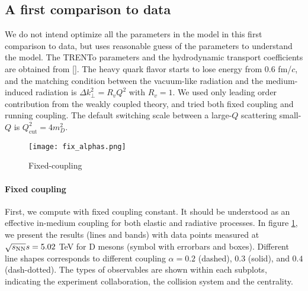 \subsection{A first comparison to data}
We do not intend optimize all the parameters in the model in this first comparison to data, but uses reasonable guess of the parameters to understand the model.
The TRENTo parameters and the hydrodynamic transport coefficients are obtained from [].
The heavy quark flavor starts to lose energy from $0.6$ fm/$c$, and the matching condition between the vacuum-like radiation and the medium-induced radiation is $\Delta k_\perp^2 = R_v Q^2$ with $R_v = 1$.
We used only leading order contribution from the weakly coupled theory, and tried both fixed coupling and running coupling.
The default switching scale between a large-$Q$ scattering small-$Q$ is $Q_{\textrm{cut}}^2 = 4 m_D^2$.

\begin{figure}
\centering
\texttt{[image: fix\_alphas.png]}
\caption{Fixed-coupling}
\label{fig:new:fix-a}
\end{figure}

\paragraph{Fixed coupling} First, we compute with fixed coupling constant.
It should be understood as an effective in-medium coupling for both elastic and radiative processes.
In figure \ref{fig:new:fix-a}, we present the results (lines and bands) with data points measured at $\sqrt{s_\mathrm{NN}}{s} = 5.02$ TeV for D mesons (symbol with errorbars and boxes).
Different line shapes corresponds to different coupling $\alpha=0.2$ (dashed), $0.3$ (solid), and $0.4$ (dash-dotted). 
The types of observables are shown within each subplots, indicating the experiment collaboration, the collision system and the centrality.


